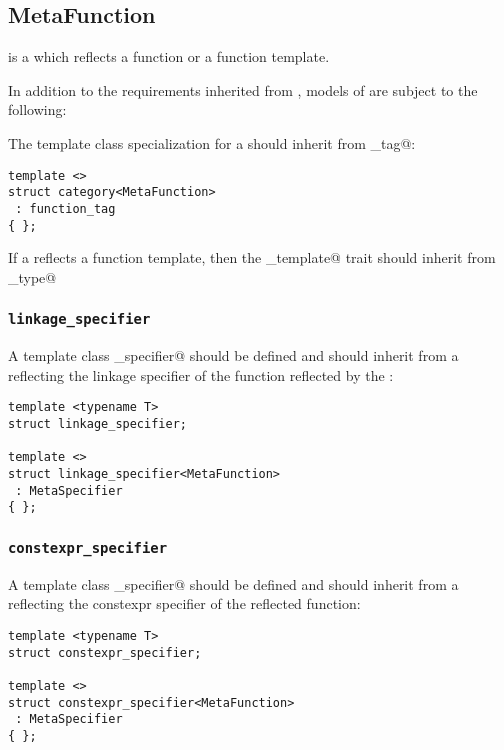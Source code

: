 \subsection{MetaFunction}
\label{concept-MetaFunction}

 is a  which reflects a function or a function template.

In addition to the requirements inherited from ,
models of  are subject to the following:

The \verb@category@ template class specialization for a  should
inherit from \verb@function_tag@:

\begin{verbatim}
template <>
struct category<MetaFunction>
 : function_tag
{ };
\end{verbatim}

If a  reflects a function template, then the \verb@is_template@
trait should inherit from \verb@true_type@

\subsubsection{\texttt{linkage\_specifier}}

A template class \verb@linkage_specifier@ should be defined and should inherit from
a  reflecting the linkage specifier of the function reflected by
the :

\begin{verbatim}
template <typename T>
struct linkage_specifier;

template <>
struct linkage_specifier<MetaFunction>
 : MetaSpecifier
{ };
\end{verbatim}

\subsubsection{\texttt{constexpr\_specifier}}

A template class \verb@constexpr_specifier@ should be defined and should inherit from
a  reflecting the constexpr specifier of the reflected function:

\begin{verbatim}
template <typename T>
struct constexpr_specifier;

template <>
struct constexpr_specifier<MetaFunction>
 : MetaSpecifier
{ };
\end{verbatim}

